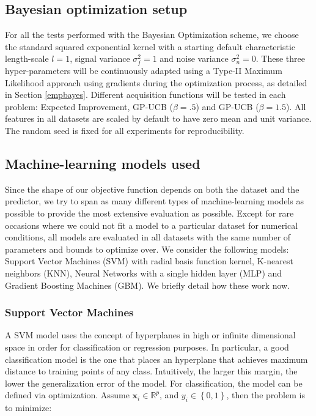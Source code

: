 \documentclass[10pt,a4paper,twoside]{book}
\begin{document}
\subsection{Bayesian optimization setup}

For all the tests performed with the Bayesian Optimization scheme, we choose the standard squared exponential kernel with a starting default characteristic length-scale $l=1$, signal variance $\sigma_f^2=1$ and noise variance $\sigma_n^2 = 0$. These three hyper-parameters will be continuously adapted using a Type-II Maximum Likelihood approach using gradients during the optimization process, as detailed in Section \ref{empbayes}. Different acquisition functions will be tested in each problem: Expected Improvement, GP-UCB ($\beta= .5$) and GP-UCB ($\beta = 1.5$). All features in all datasets are scaled by default to have zero mean and unit variance. The random seed is fixed for all experiments for reproducibility.

\subsection{Machine-learning models used}

Since the shape of our objective function depends on both the dataset and the predictor, we try to span as many different types of machine-learning models as possible to provide the most extensive evaluation as possible. Except for rare occasions where we could not fit a model to a particular dataset for numerical conditions, all models are evaluated in all datasets with the same number of parameters and bounds to optimize over. We consider the following models: Support Vector Machines (SVM) with radial basis function kernel, K-nearest neighbors (KNN), Neural Networks with a single hidden layer (MLP) and Gradient Boosting Machines (GBM). We briefly detail how these work now.

\subsubsection{Support Vector Machines}

A SVM model \cite{Cortes1995} uses the concept of hyperplanes in high or infinite dimensional space in order for classification or regression purposes. In particular, a good classification model is the one that places an hyperplane that achieves maximum distance to training points of any class. Intuitively, the larger this margin, the lower the generalization error of the model. For classification, the model can be defined via optimization. Assume $\boldsymbol{x}_i \in \mathbb{R}^p$, and $y_i \in \left\lbrace 0, 1 \right\rbrace$, then the problem is to minimize:
\end{document}
